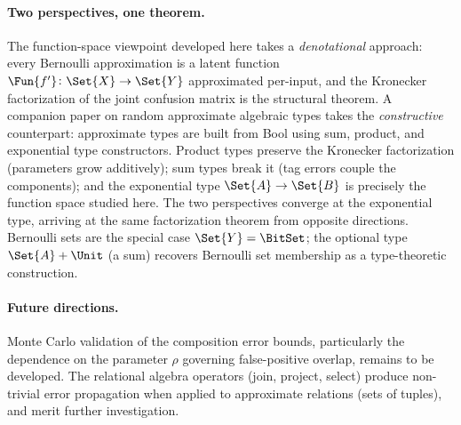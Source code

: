 \documentclass[ ../main.tex]{subfiles}
\begin{document}
\paragraph{Two perspectives, one theorem.}
The function-space viewpoint developed here takes a \emph{denotational} approach: every Bernoulli approximation is a latent function $\Fun{f'} \colon \Set{X} \to \Set{Y}$ approximated per-input, and the Kronecker factorization of the joint confusion matrix is the structural theorem.
A companion paper on random approximate algebraic types takes the \emph{constructive} counterpart: approximate types are built from Bool using sum, product, and exponential type constructors.
Product types preserve the Kronecker factorization (parameters grow additively); sum types break it (tag errors couple the components); and the exponential type $\Set{A} \to \Set{B}$ is precisely the function space studied here.
The two perspectives converge at the exponential type, arriving at the same factorization theorem from opposite directions.
Bernoulli sets are the special case $\Set{Y} = \BitSet$; the optional type $\Set{A} + \Unit$ (a sum) recovers Bernoulli set membership as a type-theoretic construction.

\paragraph{Future directions.}
Monte Carlo validation of the composition error bounds, particularly the dependence on the parameter $\rho$ governing false-positive overlap, remains to be developed.
The relational algebra operators (join, project, select) produce non-trivial error propagation when applied to approximate relations (sets of tuples), and merit further investigation.
\end{document}

